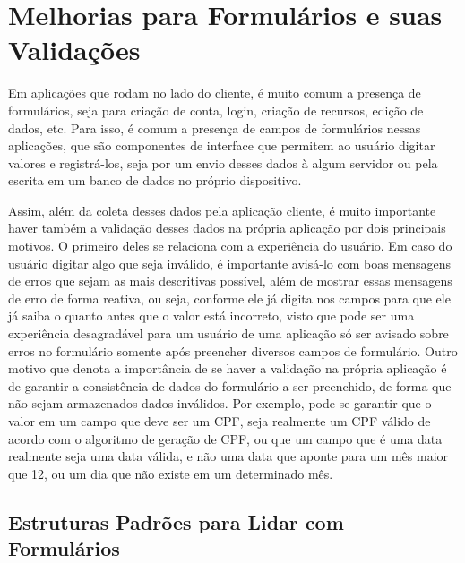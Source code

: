 \documentclass[12pt, %
openright, 
oneside, %
a4paper,    %
brazil]{facom-ufu-abntex2}
\begin{document}
\section{Melhorias para Formulários e suas Validações}

Em aplicações que rodam no lado do cliente, é muito comum a presença de formulários, seja para criação de conta, login, criação de recursos, edição de dados, etc. Para isso, é comum a presença de campos de formulários nessas aplicações, que são componentes de interface que permitem ao usuário digitar valores e registrá-los, seja por um envio desses dados à algum servidor ou pela escrita em um banco de dados no próprio dispositivo.

Assim, além da coleta desses dados pela aplicação cliente, é muito importante haver também a validação desses dados na própria aplicação por dois principais motivos. O primeiro deles se relaciona com a experiência do usuário. Em caso do usuário digitar algo que seja inválido, é importante avisá-lo com boas mensagens de erros que sejam as mais descritivas possível, além de mostrar essas mensagens de erro de forma reativa, ou seja, conforme ele já digita nos campos para que ele já saiba o quanto antes que o valor está incorreto, visto que pode ser uma experiência desagradável para um usuário de uma aplicação só ser avisado sobre erros no formulário somente após preencher diversos campos de formulário. Outro motivo que denota a importância de se haver a validação na própria aplicação é de garantir a consistência de dados do formulário a ser preenchido, de forma que não sejam armazenados dados inválidos. Por exemplo, pode-se garantir que o valor em um campo que deve ser um CPF, seja realmente um CPF válido de acordo com o algoritmo de geração de CPF, ou que um campo que é uma data realmente seja uma data válida, e não uma data que aponte para um mês maior que 12, ou um dia que não existe em um determinado mês.

\subsection{Estruturas Padrões para Lidar com Formulários}
\end{document}
